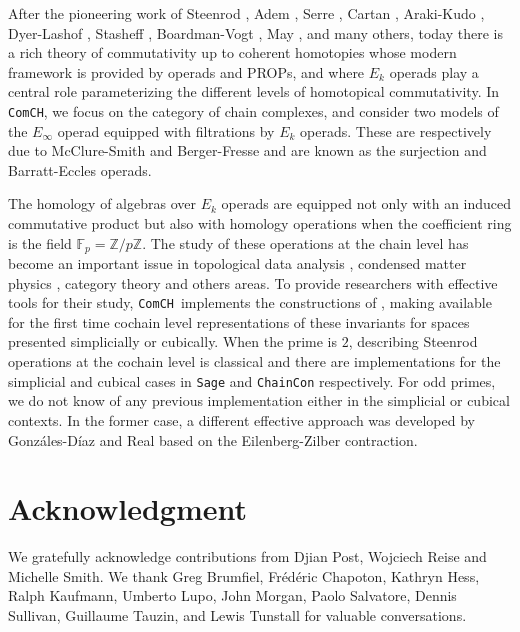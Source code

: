 \documentclass{amsart}
\newcommand{\comch}{\texttt{ComCH}}
\begin{document}
After the pioneering work of Steenrod \cite{Steenrod47, Steenrod62}, Adem \cite{Adem52}, Serre \cite{Serre53}, Cartan \cite{Cartan55}, Araki-Kudo \cite{ArakiKudo56}, Dyer-Lashof \cite{DyerLashof62}, Stasheff \cite{Stasheff63}, Boardman-Vogt \cite{BoardmanVogt73}, May \cite{May70algebraic, May72geometry}, and many others, today there is a rich theory of commutativity up to coherent homotopies whose modern framework is provided by operads and PROPs, and where $E_k$ operads play a central role parameterizing the different levels of homotopical commutativity.
In \comch, we focus on the category of chain complexes, and consider two models of the $E_\infty$ operad equipped with filtrations by $E_k$ operads.
These are respectively due to McClure-Smith \cite{McClureSmith03} and Berger-Fresse \cite{BergerFresse04} and are known as the surjection and Barratt-Eccles operads.

The homology of algebras over $E_k$ operads are equipped not only with an induced commutative product but also with homology operations when the coefficient ring is the field $\mathbb F_p = \mathbb Z/ p\mathbb Z$.
The study of these operations at the chain level has become an important issue in topological data analysis \cite{medina2018persistence}, condensed matter physics \cite{Kapustin2017}, category theory \cite{medina2020globular} and others areas.
To provide researchers with effective tools for their study, \comch\, implements the constructions of \cite{medina2020maysteenrod}, making available for the first time cochain level representations of these invariants for spaces presented simplicially or cubically.
When the prime is $2$, describing Steenrod operations at the cochain level is classical and there are implementations for the simplicial \cite{GonReal1999} and cubical \cite{Pilarczyk2016} cases in \texttt{Sage} \cite{sage} and \texttt{ChainCon} \cite{chaincon} respectively.
For odd primes, we do not know of any previous implementation either in the simplicial or cubical contexts.
In the former case, a different effective approach was developed by Gonz\'ales-D\'iaz and Real \cite{GonReal2003, GonReal2005} based on the Eilenberg-Zilber contraction.

\section*{Acknowledgment}
We gratefully acknowledge contributions from Djian Post, Wojciech Reise and Michelle Smith.
We thank Greg Brumfiel, Fr\'{e}d\'{e}ric Chapoton, Kathryn Hess, Ralph Kaufmann, Umberto Lupo, John Morgan, Paolo Salvatore, Dennis Sullivan, Guillaume Tauzin, and Lewis Tunstall for valuable conversations.
\end{document}
